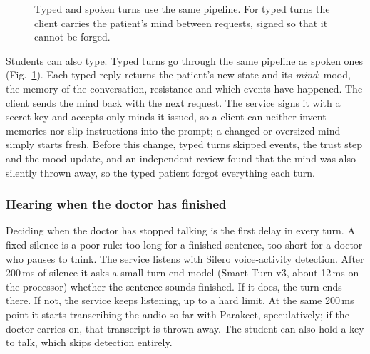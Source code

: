 \documentclass[10pt]{article}
\begin{document}
\begin{figure}[htbp]
\centering
{}
\caption{Typed and spoken turns use the same pipeline. For typed turns the client carries the patient's mind between requests, signed so that
it cannot be forged.}
\label{p2:fig:paths}
\end{figure}

Students can also type. Typed turns go through the same pipeline as spoken ones (Fig.~\ref{p2:fig:paths}). Each typed reply returns the patient's new
state and its \emph{mind}: mood, the memory of the conversation, resistance and which events have happened. The client sends the mind back with
the next request. The service signs it with a secret key and accepts only minds it issued, so a client can neither invent memories nor slip
instructions into the prompt; a changed or oversized mind simply starts fresh. Before this change, typed turns skipped events, the trust step and
the mood update, and an independent review found that the mind was also silently thrown away, so the typed patient forgot everything each turn.

\subsubsection{Hearing when the doctor has finished}
Deciding when the doctor has stopped talking is the first delay in every turn. A fixed silence is a poor rule: too long for a finished sentence,
too short for a doctor who pauses to think. The service listens with Silero voice-activity detection. After 200\,ms of silence it asks a small turn-end model (Smart Turn v3, about 12\,ms on the processor) whether the sentence sounds finished. If it does, the turn ends there. If not, the service keeps listening, up to a hard limit. At the same 200\,ms point it starts transcribing the audio so far with Parakeet, speculatively; if the
doctor carries on, that transcript is thrown away. The student can also hold a key to talk, which skips detection entirely.
\end{document}
